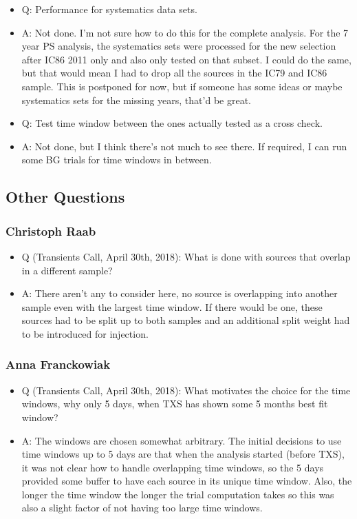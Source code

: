 \begin{itemize}
      \item Q:
        Performance for systematics data sets.
      \item A:
        \textcolor{nordorange}{Not done}.
        I'm not sure how to do this for the complete analysis.
        For the 7 year PS analysis, the systematics sets were processed for the new selection after IC86 2011 only and also only tested on that subset.
        I could do the same, but that would mean I had to drop all the sources in the IC79 and IC86 sample.
        This is postponed for now, but if someone has some ideas or maybe systematics sets for the missing years, that'd be great.

      \item Q:
        Test time window between the ones actually tested as a cross check.
      \item A:
        \textcolor{nordorange}{Not done}, but I think there's not much to see there.
        If required, I can run some BG trials for time windows in between.
  \end{itemize}

\subsection*{Other Questions}
\subsubsection*{Christoph Raab}
  \begin{itemize}
      \item Q (Transients Call, April 30th, 2018):
        What is done with sources that overlap in a different sample?
      \item A:
        There aren't any to consider here, no source is overlapping into another sample even with the largest time window.
        If there would be one, these sources had to be split up to both samples and an additional split weight had to be introduced for injection.
  \end{itemize}

\subsubsection*{Anna Franckowiak}
  \begin{itemize}
      \item Q (Transients Call, April 30th, 2018):
        What motivates the choice for the time windows, why only 5 days, when TXS has shown some 5 months best fit window?
      \item A:
        The windows are chosen somewhat arbitrary.
        The initial decisions to use time windows up to 5 days are that when the analysis started (before TXS), it was not clear how to handle overlapping time windows, so the 5 days provided some buffer to have each source in its unique time window.
        Also, the longer the time window the longer the trial computation takes so this was also a slight factor of not having too large time windows.
  \end{itemize}

